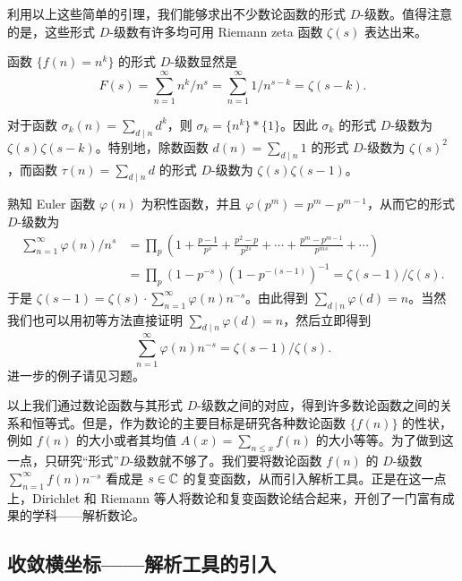 利用以上这些简单的引理，我们能够求出不少数论函数的形式 $D$-级数。值得注意的是，这些形式 $D$-级数有许多均可用 Riemann zeta 函数 $\zeta(s)$ 表达出来。

\setcounter{example}{0}%

\begin{example}
函数 $\{f(n)=n^k\}$ 的形式 $D$-级数显然是
\[
  F(s)=\sum_{n=1}^{\infty}n^k/n^s=\sum_{n=1}^{\infty}1/n^{s-k}=\zeta(s-k).
\]
\end{example}

\begin{example}
对于函数 $\sigma_k(n)=\sum_{d\mid n}d^k$，则 $\sigma_k=\{n^k\}*\{1\}$。因此 $\sigma_k$ 的形式 $D$-级数为 $\zeta(s)\zeta(s-k)$。特别地，除数函数 $d(n)=\sum_{d\mid n}1$ 的形式 $D$-级数为 $\zeta(s)^2$，而函数 $\tau(n)=\sum_{d\mid n}d$ 的形式 $D$-级数为 $\zeta(s)\zeta(s-1)$。
\end{example}

\begin{example}
熟知 Euler 函数 $\varphi(n)$ 为积性函数，并且 $\varphi(p^m)=p^m-p^{m-1}$，从而它的形式 $D$-级数为
\begin{align*}
  \sum_{n=1}^{\infty}\varphi(n)/n^s
  &=\prod_p\left(1+\frac{p-1}{p^s}+\frac{p^2-p}{p^{2s}}+\cdots+\frac{p^m-p^{m-1}}{p^{ms}}+\cdots\right)\\
  &=\prod_p(1-p^{-s})(1-p^{-(s-1)})^{-1}=\zeta(s-1)/\zeta(s).
\end{align*}
于是 $\zeta(s-1)=\zeta(s)\cdot\sum_{n=1}^{\infty}\varphi(n)n^{-s}$。由此得到 $\sum_{d\mid n}\varphi(d)=n$。当然我们也可以用初等方法直接证明 $\sum_{d\mid n}\varphi(d)=n$，然后立即得到
\[
  \sum_{n=1}^{\infty}\varphi(n)n^{-s}=\zeta(s-1)/\zeta(s).
\]
进一步的例子请见习题。
\end{example}

\begin{sloppypar}
以上我们通过数论函数与其形式 $D$-级数之间的对应，得到许多数论函数之间的关系和恒等式。但是，作为数论的主要目标是研究各种数论函数 $\{f(n)\}$ 的性状，例如 $f(n)$ 的大小或者其均值 $A(x)=\sum_{n\leqslant x}f(n)$ 的大小等等。为了做到这一点，只研究``形式''$D$-级数就不够了。我们要将数论函数 $f(n)$ 的 $D$-级数 $\sum_{n=1}^{\infty}f(n)n^{-s}$ 看成是 $s\in\mathbb{C}$ 的复变函数，从而引入解析工具。正是在这一点上，Dirichlet 和 Riemann 等人将数论和复变函数论结合起来，开创了一门富有成果的学科——解析数论。
\end{sloppypar}

\subsection{收敛横坐标——解析工具的引入}\label{sec:ch4-s1-2}

